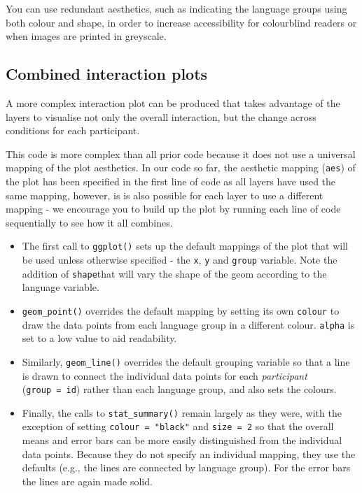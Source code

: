 \documentclass[
  english,
  doc,floatsintext]{apa6}
\providecommand{\tightlist}{%
  \setlength{\itemsep}{0pt}\setlength{\parskip}{0pt}}
\begin{document}
You can use redundant aesthetics, such as indicating the language groups using both colour and shape, in order to increase accessibility for colourblind readers or when images are printed in greyscale.

\hypertarget{combined-interaction-plots}{%
\subsection{Combined interaction plots}\label{combined-interaction-plots}}

A more complex interaction plot can be produced that takes advantage of the layers to visualise not only the overall interaction, but the change across conditions for each participant.

This code is more complex than all prior code because it does not use a universal mapping of the plot aesthetics. In our code so far, the aesthetic mapping (\texttt{aes}) of the plot has been specified in the first line of code as all layers have used the same mapping, however, is is also possible for each layer to use a different mapping - we encourage you to build up the plot by running each line of code sequentially to see how it all combines.

\begin{itemize}
\tightlist
\item
  The first call to \texttt{ggplot()} sets up the default mappings of the plot that will be used unless otherwise specified - the \texttt{x}, \texttt{y} and \texttt{group} variable. Note the addition of \texttt{shape}that will vary the shape of the geom according to the language variable.
\item
  \texttt{geom\_point()} overrides the default mapping by setting its own \texttt{colour} to draw the data points from each language group in a different colour. \texttt{alpha} is set to a low value to aid readability.
\item
  Similarly, \texttt{geom\_line()} overrides the default grouping variable so that a line is drawn to connect the individual data points for each \emph{participant} (\texttt{group\ =\ id}) rather than each language group, and also sets the colours.\\
\item
  Finally, the calls to \texttt{stat\_summary()} remain largely as they were, with the exception of setting \texttt{colour\ =\ "black"} and \texttt{size\ =\ 2} so that the overall means and error bars can be more easily distinguished from the individual data points. Because they do not specify an individual mapping, they use the defaults (e.g., the lines are connected by language group). For the error bars the lines are again made solid.
\end{itemize}
\end{document}
